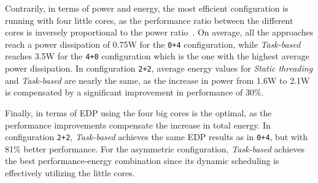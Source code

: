 Contrarily, in terms of power and energy, the most efficient configuration is running with four little cores, as the performance ratio between the different cores is inversely proportional to the power ratio~\cite{Greenhalgh2011}. On average, all the approaches reach a power dissipation of 0.75W for the \texttt{0+4} configuration, while \emph{Task-based} reaches 3.5W for the \texttt{4+0} configuration which is the one with the highest average power dissipation. In configuration \texttt{2+2}, average energy values for \emph{Static threading} and \emph{Task-based} are nearly the same, as the increase in power from 1.6W to 2.1W is compensated by a significant improvement in performance of 30\%.

Finally, in terms of EDP using the four big cores is the optimal, as the performance improvements compensate the increase in total energy. 
In configuration \texttt{2+2}, \emph{Task-based} achieves the same EDP results as in \texttt{0+4}, but with 81\% better performance. 
For the asymmetric configuration, \emph{Task-based} achieves the best performance-energy combination since its dynamic scheduling is effectively utilizing the little cores. 



